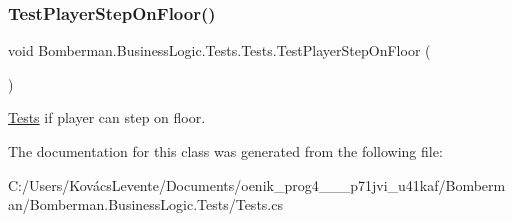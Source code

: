 \subsubsection{\texorpdfstring{TestPlayerStepOnFloor()}{TestPlayerStepOnFloor()}}
{\footnotesize\ttfamily void Bomberman.\+Business\+Logic.\+Tests.\+Tests.\+Test\+Player\+Step\+On\+Floor (\begin{DoxyParamCaption}{ }\end{DoxyParamCaption})\hspace{0.3cm}{\ttfamily [inline]}}



\mbox{\hyperlink{class_bomberman_1_1_business_logic_1_1_tests_1_1_tests}{Tests}} if player can step on floor. 



The documentation for this class was generated from the following file\+:\begin{DoxyCompactItemize}
\item 
C\+:/\+Users/\+Kovács\+Levente/\+Documents/oenik\+\_\+prog4\+\_\+\_\+\_\+p71jvi\+\_\+u41kaf/\+Bomberman/\+Bomberman.\+Business\+Logic.\+Tests/Tests.\+cs\end{DoxyCompactItemize}
